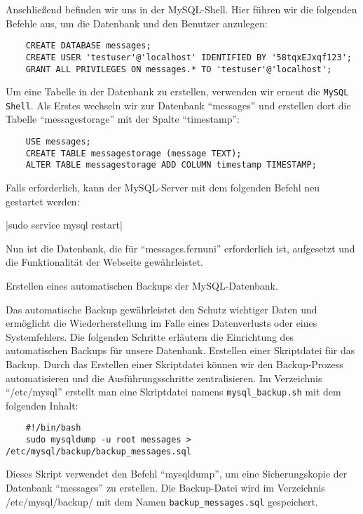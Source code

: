 Anschließend befinden wir uns in der MySQL-Shell. Hier führen wir die folgenden Befehle aus, um die Datenbank und den Benutzer anzulegen:

\begin{verbatim}
    CREATE DATABASE messages;
    CREATE USER 'testuser'@'localhost' IDENTIFIED BY '58tqxEJxqf123';
    GRANT ALL PRIVILEGES ON messages.* TO 'testuser'@'localhost';
\end{verbatim}

Um eine Tabelle in der Datenbank zu erstellen, verwenden wir erneut die \verb+MySQL Shell+.
Als Erstes wechseln wir zur Datenbank \enquote{messages} und erstellen dort die Tabelle \enquote{messagestorage} mit der Spalte \enquote{timestamp}:

\begin{verbatim}
    USE messages;
    CREATE TABLE messagestorage (message TEXT);
    ALTER TABLE messagestorage ADD COLUMN timestamp TIMESTAMP;
\end{verbatim}

Falls erforderlich, kann der MySQL-Server mit dem folgenden Befehl neu gestartet werden:

|sudo service mysql restart|

Nun ist die Datenbank, die für \enquote{messages.fernuni} erforderlich ist, aufgesetzt und die Funktionalität der Webseite gewährleistet.

Erstellen eines automatischen Backups der MySQL-Datenbank.

Das automatische Backup gewährleistet den Schutz wichtiger Daten und ermöglicht die Wiederherstellung im Falle eines Datenverlusts oder eines Systemfehlers. Die folgenden Schritte erläutern die Einrichtung des automatischen Backups für unsere Datenbank.
Erstellen einer Skriptdatei für das Backup.
Durch das Erstellen einer Skriptdatei können wir den Backup-Prozess automatisieren und die Ausführungsschritte zentralisieren.
Im Verzeichnis \enquote{/etc/mysql} erstellt man eine Skriptdatei namens \verb+mysql_backup.sh+ mit dem folgenden Inhalt:

\begin{verbatim}
    #!/bin/bash
    sudo mysqldump -u root messages > /etc/mysql/backup/backup_messages.sql
\end{verbatim}

Dieses Skript verwendet den Befehl \enquote{mysqldump}, um eine Sicherungskopie der Datenbank \enquote{messages} zu erstellen. 
Die Backup-Datei wird im Verzeichnis /etc/mysql/backup/ mit dem Namen \verb+backup_messages.sql+ gespeichert.

